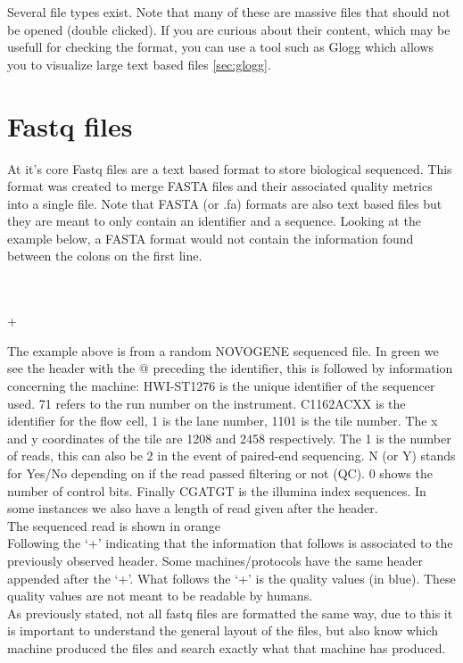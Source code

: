 \label{chap:File_types}
Several file types exist. Note that many of these are massive files that should not be opened (double clicked). If you are curious about their content, which may be usefull for checking the format, you can use a tool such as Glogg which allows you to visualize large text based files \autoref{sec:glogg}.

\section{Fastq files \label{sec:Fastq_files}}
At it's core Fastq files are a text based format to store biological sequenced. This format was created to merge FASTA files and their associated quality metrics into a single file. Note that FASTA (or .fa) formats are also text based files but they are meant to only contain an identifier and a sequence. Looking at the example below, a FASTA format would not contain the information found between the colons on the first line.
\begin{formal}
\\ 
\\
+\\
\end{formal}
The example above is from a random NOVOGENE sequenced file. In green we see the header with the @ preceding the identifier, this is followed by information concerning the machine: HWI-ST1276 is the unique identifier of the sequencer used. 71 refers to the run number on the instrument. C1162ACXX is the identifier for the flow cell, 1 is the lane number, 1101 is the tile number. The x and y coordinates of the tile are 1208 and 2458 respectively. The 1 is the number of reads, this can also be 2 in the event of paired-end sequencing. N (or Y) stands for Yes/No depending on if the read passed filtering or not (QC). 0 shows the number of control bits. Finally CGATGT is the illumina index sequences. In some instances we also have a length of read given after the header.\\
The sequenced read is shown in orange\\
Following the `+'  indicating that the information that follows is associated to the previously observed header. Some machines/protocols have the same header appended after the `+'. What follows the `+' is the quality values (in blue). These quality values are not meant to be readable by humans.\\
As previously stated, not all fastq files are formatted the same way, due to this it is important to understand the general layout of the files, but also know which machine produced the files and search exactly what that machine has produced.

